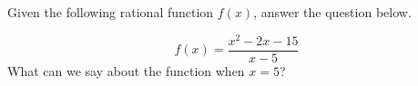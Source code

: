 \documentclass{ximera}
\author{David Kish}
\begin{document}
Given the following rational function $f(x)$, answer the question below.
\begin{exercise}
\[
f(x)=\frac{x^2-2x-15}{x-5}
\]
What can we say about the function when $x=5$?
\begin{multipleChoice}  
\end{multipleChoice}  
\end{exercise}
\end{document}
